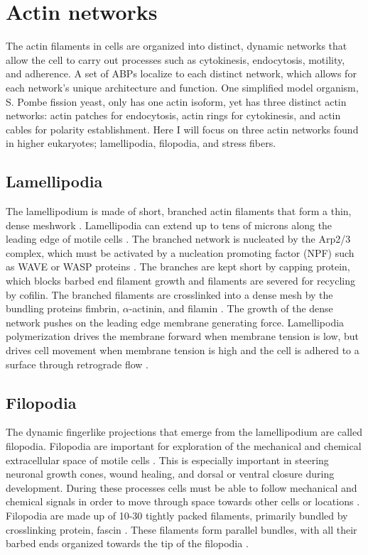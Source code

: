 \section{Actin networks}\label{network-intro}
The actin filaments in cells are organized into distinct, dynamic networks that allow the cell to carry out processes such as cytokinesis, endocytosis, motility, and adherence. A set of ABPs localize to each distinct network, which allows for each network's unique architecture and function. One simplified model organism, S. Pombe fission yeast, only has one actin isoform, yet has three distinct actin networks: actin patches for endocytosis, actin rings for cytokinesis, and actin cables for polarity establishment. Here I will focus on three actin networks found in higher eukaryotes; lamellipodia, filopodia, and stress fibers. 

\subsection{Lamellipodia}\label{lamellipodia-intro}
The lamellipodium is made of short, branched actin filaments that form a thin, dense meshwork \citep{small_lamellipodium:_2002}. Lamellipodia can extend up to tens of microns along the leading edge of motile cells \citep{skau_specification_2015}. The branched network is nucleated by the Arp2/3 complex, which must be activated by a nucleation promoting factor (NPF) such as WAVE or WASP proteins \citep{blanchoin_actin_2014}. The branches are kept short by capping protein, which blocks barbed end filament growth and filaments are severed for recycling by cofilin. The branched filaments are crosslinked into a dense mesh by the bundling proteins fimbrin, $\alpha$-actinin, and filamin \citep{small_lamellipodium:_2002}. The growth of the dense network pushes on the leading edge membrane generating force. Lamellipodia polymerization drives the membrane forward when membrane tension is low, but drives cell movement when membrane tension is high and the cell is adhered to a surface through retrograde flow \citep{skau_specification_2015}.  

\subsection{Filopodia}\label{filopodia-intro}
The dynamic fingerlike projections that emerge from the lamellipodium are called filopodia. Filopodia are important for exploration of the mechanical and chemical extracellular space of motile cells \citep{mattila_filopodia:_2008}. This is especially important in steering neuronal growth cones, wound healing, and dorsal or ventral closure during development. During these processes cells must be able to follow mechanical and chemical signals in order to move through space towards other cells or locations \citep{bornschlogl_how_2013}. Filopodia are made up of 10-30 tightly packed filaments, primarily bundled by crosslinking protein, fascin \citep{vignjevic_role_2006, mellor_role_2010}. These filaments form parallel bundles, with all their barbed ends organized towards the tip of the filopodia \citep{bornschlogl_how_2013}.

